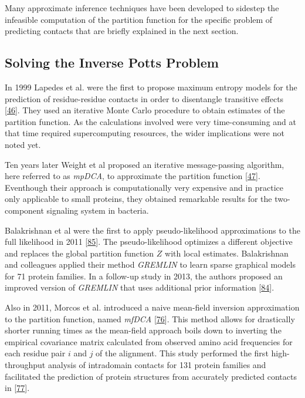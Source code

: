 \documentclass[12pt,a4paper,twoside]{book}
\theoremstyle{definition}
\theoremstyle{definition}
\theoremstyle{remark}
\begin{document}
Many approximate inference techniques have been developed to sidestep
the infeasible computation of the partition function for the specific
problem of predicting contacts that are briefly explained in the next
section.

\subsection{Solving the Inverse Potts
Problem}\label{potts-model-solutions}

In 1999 Lapedes et al. were the first to propose maximum entropy models
for the prediction of residue-residue contacts in order to disentangle
transitive effects {[}\protect\hyperlink{ref-Lapedes1999}{46}{]}. They
used an iterative Monte Carlo procedure to obtain estimates of the
partition function. As the calculations involved were very
time-consuming and at that time required supercomputing resources, the
wider implications were not noted yet.

Ten years later Weight et al proposed an iterative message-passing
algorithm, here referred to as \emph{mpDCA}, to approximate the
partition function {[}\protect\hyperlink{ref-Weigt2009}{47}{]}.
Eventhough their approach is computationally very expensive and in
practice only applicable to small proteins, they obtained remarkable
results for the two-component signaling system in bacteria.

Balakrishnan et al were the first to apply pseudo-likelihood
approximations to the full likelihood in 2011
{[}\protect\hyperlink{ref-Balakrishnan2011}{85}{]}. The
pseudo-likelihood optimizes a different objective and replaces the
global partition function \(Z\) with local estimates. Balakrishnan and
colleagues applied their method \emph{GREMLIN} to learn sparse graphical
models for 71 protein families. In a follow-up study in 2013, the
authors proposed an improved version of \emph{GREMLIN} that uses
additional prior information
{[}\protect\hyperlink{ref-Kamisetty2013}{84}{]}.

Also in 2011, Morcos et al. introduced a naive mean-field inversion
approximation to the partition function, named \emph{mfDCA}
{[}\protect\hyperlink{ref-Morcos2011}{76}{]}. This method allows for
drastically shorter running times as the mean-field approach boils down
to inverting the empirical covariance matrix calculated from observed
amino acid frequencies for each residue pair \(i\) and \(j\) of the
alignment. This study performed the first high-throughput analysis of
intradomain contacts for 131 protein families and facilitated the
prediction of protein structures from accurately predicted contacts in
{[}\protect\hyperlink{ref-Marks2011}{77}{]}.
\end{document}

